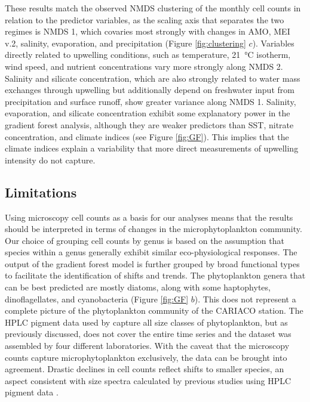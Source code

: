 \documentclass[draft]{agujournal2019}
\begin{document}
These results match the observed NMDS clustering of the monthly cell counts in relation to the predictor variables, as the scaling axis that separates the two regimes is NMDS 1, which covaries most strongly with changes in AMO, MEI v.2, salinity, evaporation, and precipitation (Figure \ref{fig:clustering} $c$). Variables directly related to upwelling conditions, such as temperature, \qty{21}{\celsius} isotherm, wind speed, and nutrient concentrations vary more strongly along NMDS 2. Salinity and silicate concentration, which are also strongly related to water mass exchanges through upwelling but additionally depend on freshwater input from precipitation and surface runoff, show greater variance along NMDS 1. Salinity, evaporation, and silicate concentration exhibit some explanatory power in the gradient forest analysis, although they are weaker predictors than SST, nitrate concentration, and climate indices (see Figure \ref{fig:GF}). This implies that the climate indices explain a variability that more direct measurements of upwelling intensity do not capture. 


\subsection{Limitations}

Using microscopy cell counts as a basis for our analyses means that the results should be interpreted in terms of changes in the microphytoplankton community. Our choice of grouping cell counts by genus is based on the assumption that species within a genus generally exhibit similar eco-physiological responses. The output of the gradient forest model is further grouped by broad functional types to facilitate the identification of shifts and trends. The phytoplankton genera that can be best predicted are mostly diatoms, along with some haptophytes, dinoflagellates, and cyanobacteria (Figure \ref{fig:GF} $b$). This does not represent a complete picture of the phytoplankton community of the CARIACO station. The HPLC pigment data used by \citeauthor{pinckney_phytoplankton_2015} capture all size classes of phytoplankton, but as previously discussed, does not cover the entire time series and the dataset was assembled by four different laboratories. With the caveat that the microscopy counts capture microphytoplankton exclusively, the data can be brought into agreement. Drastic declines in cell counts reflect shifts to smaller species, an aspect consistent with size spectra calculated by previous studies using HPLC pigment data \cite{lorenzoni_characterization_2015}.
\end{document}
